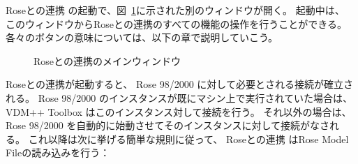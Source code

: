 \documentclass[\pformat,12pt]{jarticle}
\newcommand{\vdmpp}{VDM++}
\newcommand{\link}{Roseとの連携}
\newcommand{\rose}{Rose 98/2000}
\begin{document}
 \link{} の起動で、図~\ref{fig:userinterface}に示された別のウィンドウが開く。
起動中は、 このウィンドウから\link{}のすべての機能の操作を行うことができる。
各々のボタンの意味については、以下の章で説明していこう。

\begin{figure}[htb]
\begin{center}
\mbox{}
\caption{\link{}のメインウィンドウ　\label{fig:userinterface}}
\end{center}
\end{figure}

\link{}が起動すると、 \rose{} に対して必要とされる接続が確立される。
 \rose{} のインスタンスが既にマシン上で実行されていた場合は、 \vdmpp{} Toolbox はこのインスタンス対して接続を行う。
それ以外の場合は、　\rose{} を自動的に始動させてそのインスタンスに対して接続がなされる。
これ以降は次に挙げる簡単な規則に従って、  \link{} はRose Model Fileの読み込みを行う：
\end{document}
